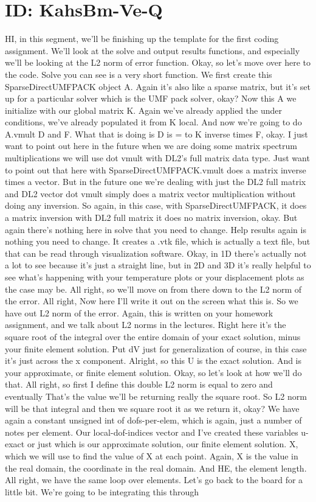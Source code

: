 \documentclass[10pt]{article}
\begin{document}
{\section*{ID: KahsBm-Ve-Q}
HI, in this segment, we'll be finishing up the template for the first coding assignment. We'll look at the solve and output results functions, and especially we'll be looking at the L2 norm of error function. Okay, so let's move over here to the code. Solve you can see is a very short function. We first create this SparseDirectUMFPACK object A. Again it's also like a sparse matrix, but it's set up for a particular solver which is the UMF pack solver, okay? Now this A we initialize with our global matrix K. Again we've already applied the under conditions, we've already populated it from K local. And now we're going to do A.vmult D and F. What that is doing is D is = to K inverse times F, okay. I just want to point out here in the future when we are doing some matrix spectrum multiplications we will use dot vmult with DL2's full matrix data type. Just want to point out that here with SparseDirectUMFPACK.vmult does a matrix inverse times a vector. But in the future one we're dealing with just the DL2 full matrix and DL2 vector dot vmult simply does a matrix vector multiplication without doing any inversion. So again, in this case, with SparseDirectUMFPACK, it does a matrix inversion with DL2 full matrix it does no matrix inversion, okay. But again there's nothing here in solve that you need to change. Help results again is nothing you need to change. It creates a .vtk file, which is actually a text file, but that can be read through visualization software. Okay, in 1D there's actually not a lot to see because it's just a straight line, but in 2D and 3D it's really helpful to see what's happening with your temperature plots or your displacement plots as the case may be. All right, so we'll move on from there down to the L2 norm of the error. All right, Now here I'll write it out on the screen what this is. So we have out L2 norm of the error. Again, this is written on your homework assignment, and we talk about L2 norms in the lectures. Right here it's the square root of the integral over the entire domain of your exact solution, minus your finite element solution. Put dV just for generalization of course, in this case it's just across the x component. Alright, so this U is the exact solution. And is your approximate, or finite element solution. Okay, so let's look at how we'll do that. All right, so first I define this double L2 norm is equal to zero and eventually That's the value we'll be returning really the square root. So L2 norm will be that integral and then we square root it as we return it, okay? We have again a constant unsigned int of dofs-per-elem, which is again, just a number of notes per element. Our local-dof-indices vector and I've created these variables u-exact or just which is our approximate solution, our finite element solution. X, which we will use to find the value of X at each point. Again, X is the value in the real domain, the coordinate in the real domain. And HE, the element length. All right, we have the same loop over elements. Let's go back to the board for a little bit. We're going to be integrating this through }
\end{document}
